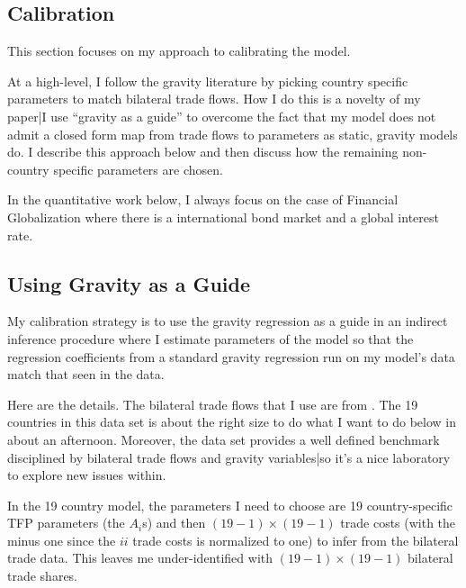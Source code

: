 \documentclass[12pt,pdftex]{article}
\begin{document}
\begin{onehalfspacing}
\section{Calibration}

This section focuses on my approach to calibrating the model.

At a high-level, I follow the gravity literature by picking country specific parameters to match bilateral trade flows. How I do this is a novelty of my paper|I use ``gravity as a guide'' to overcome the fact that my model does not admit a closed form map from trade flows to parameters as static, gravity models do. I describe this approach below and then discuss how the remaining non-country specific parameters are chosen.

In the quantitative work below, I always focus on the case of Financial Globalization where there is a international bond market and a global interest rate.

\subsection{Using Gravity as a Guide}

My calibration strategy is to use the gravity regression as a guide in an indirect inference procedure where I estimate parameters of the model so that the regression coefficients from a standard gravity regression run on my model's data match that seen in the data.

Here are the details. The bilateral trade flows that I use are from \citet{eaton2002technology}. The 19 countries in this data set is about the right size to do what I want to do below in about an afternoon. Moreover, the \citet{eaton2002technology} data set provides a well defined benchmark disciplined by bilateral trade flows and gravity variables|so it's a nice laboratory to explore new issues within.

In the 19 country model, the parameters I need to choose are 19 country-specific TFP parameters (the $A_i$s) and then $(19-1) \times (19-1)$ trade costs (with the minus one since the $ii$ trade costs is normalized to one) to infer from the bilateral trade data. This leaves me under-identified with  $(19-1) \times (19-1)$ bilateral trade shares.


\end{onehalfspacing}
\end{document}
